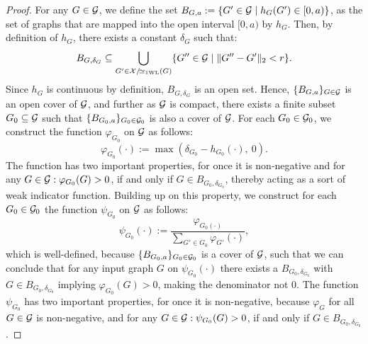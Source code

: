 \begin{proof}
    For any $G \in \mathcal{G}$, we define the set $B_{G, a} := \{ G' \in \mathcal{G} \mid h_G(G') \in [0, a) \}$, as the set of graphs that are mapped into the open interval $[0, a)$ by $h_G$. Then, by definition of $h_G$, there exists a constant $\delta_G$ such that:
    \begin{equation*}
        B_{G, \delta_G} \subseteq \bigcup_{G'\in \mathcal{X}/\!{\simeq_{\text{1WL}}}(G)} \{ G'' \in \mathcal{G} \mid \| G'' - G' \|_2 < r \}.
    \end{equation*}
    Since $h_G$ is continuous by definition, $B_{G, \delta_G}$ is an open set. Hence, $\{ B_{G, a} \}_{G \in \mathcal{G}}$ is an open cover of $\mathcal{G}$, and further as $\mathcal{G}$ is compact, there exists a finite subset $G_0 \subseteq \mathcal{G}$ such that $\{ B_{G_0, a} \}_{G_0 \in \mathcal{G}_0}$ is also a cover of $\mathcal{G}$. For each $G_0 \in \mathcal{G}_0$, we construct the function $\varphi_{G_0}$ on $\mathcal{G}$ as follows:
    \begin{equation*}
        \varphi_{G_0} (\cdot) := \max(\delta_{G_0} -  h_{G_0}(\cdot), \ 0).
    \end{equation*}
    The function has two important properties, for once it is non-negative and for any $G \in \mathcal{G}: \varphi_{G_0}(G) > 0$, if and only if $G \in B_{G_0, \delta_{G_0}}$, thereby acting as a sort of weak indicator function. Building up on this property, we construct for each $G_0 \in \mathcal{G}_0$ the function $\psi_{G_0}$ on $\mathcal{G}$ as follows:
    \begin{equation*}
        \psi_{G_0}(\cdot) := \frac{\varphi_{G_0(\cdot)}}{\sum_{G' \in G_0} \varphi_{G'}(\cdot)},
    \end{equation*}
    which is well-defined, because $\{ B_{G_0, a} \}_{G_0 \in \mathcal{G}_0}$ is a cover of $\mathcal{G}$, such that we can conclude that for any input graph $G$ on $\psi_{G_0}(\cdot)$ there exists a $B_{G_0, \delta_{G_0}}$ with $G \in B_{G_0, \delta_{G_0}}$ implying $\varphi_{G_0}(G) > 0$, making the denominator not $0$. The function $\psi_{G_0}$ has two important properties, for once it is non-negative, because $\varphi_{G}$ for all $G \in \mathcal{G}$ is non-negative, and for any $G \in \mathcal{G}: \psi_{G_0}(G) > 0$, if and only if $G \in B_{G_0, \delta_{G_0}}$.


\end{proof}
